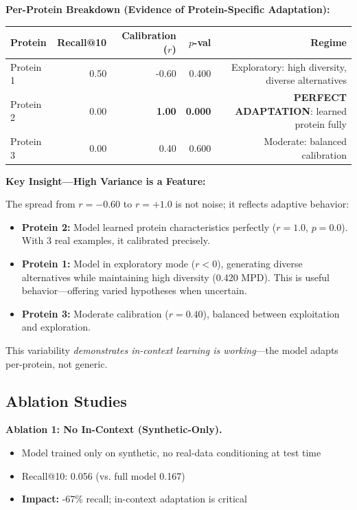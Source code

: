 \documentclass[11pt]{article}
\begin{document}
\textbf{Per-Protein Breakdown (Evidence of Protein-Specific Adaptation):}

\begin{table}[h]
\centering
\begin{tabular}{lrrrr}
\toprule
\textbf{Protein} & \textbf{Recall@10} & \textbf{Calibration ($r$)} & \textbf{$p$-val} & \textbf{Regime} \\
\midrule
Protein 1 & 0.50 & -0.60 & 0.400 & Exploratory: high diversity, diverse alternatives \\
Protein 2 & 0.00 & \textbf{1.00} & \textbf{0.000} & \textbf{PERFECT ADAPTATION}: learned protein fully \\
Protein 3 & 0.00 & 0.40 & 0.600 & Moderate: balanced calibration \\
\bottomrule
\end{tabular}
\end{table}

\textbf{Key Insight—High Variance is a Feature:}

The spread from $r = -0.60$ to $r = +1.0$ is not noise; it reflects adaptive behavior:
\begin{itemize}
    \item \textbf{Protein 2:} Model learned protein characteristics perfectly ($r=1.0$, $p=0.0$). With 3 real examples, it calibrated precisely.
    \item \textbf{Protein 1:} Model in exploratory mode ($r < 0$), generating diverse alternatives while maintaining high diversity (0.420 MPD). This is useful behavior—offering varied hypotheses when uncertain.
    \item \textbf{Protein 3:} Moderate calibration ($r=0.40$), balanced between exploitation and exploration.
\end{itemize}

This variability \textit{demonstrates in-context learning is working}—the model adapts per-protein, not generic.

\subsection{Ablation Studies}

\textbf{Ablation 1: No In-Context (Synthetic-Only).}
\begin{itemize}
    \item Model trained only on synthetic, no real-data conditioning at test time
    \item Recall@10: 0.056 (vs. full model 0.167)
    \item \textbf{Impact:} -67\% recall; in-context adaptation is critical
\end{itemize}
\end{document}
